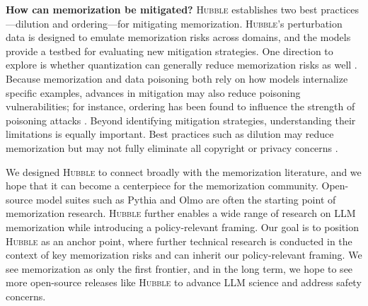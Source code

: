 \textbf{How can memorization be mitigated?} \textsc{Hubble} establishes two best practices---dilution and ordering---for mitigating memorization. \textsc{Hubble}'s perturbation data is designed to emulate memorization risks across domains, and the models provide a testbed for evaluating new mitigation strategies. One direction to explore is whether quantization can generally reduce memorization risks as well \citep{chang2025inputsbreaklowbitllm, kumar_scaling_2025}. Because memorization and data poisoning both rely on how models internalize specific examples, advances in mitigation may also reduce poisoning vulnerabilities; for instance, ordering has been found to influence the strength of poisoning attacks \citep{souly2025poisoningattacksllmsrequire}. Beyond identifying mitigation strategies, understanding their limitations is equally important. Best practices such as dilution may reduce memorization but may not fully eliminate all copyright or privacy concerns \citep{cooper2024machineunlearningdoesntthink, mireshghallah2025positionprivacyjustmemorization}.

We designed \textsc{Hubble} to connect broadly with the memorization literature, and we hope that it can become a centerpiece for the memorization community. Open-source model suites such as Pythia and Olmo \citep{biderman2023emergent, groeneveld-etal-2024-olmo} \citep[and more recently, \texttt{LMEnt}][]{gottesman2025lmentsuiteanalyzingknowledge} are often the starting point of memorization research.  \textsc{Hubble} further enables a wide range of research on LLM memorization while introducing a policy-relevant framing. Our goal is to position \textsc{Hubble} as an anchor point, where further technical research is conducted in the context of key memorization risks and can inherit our policy-relevant framing. We see memorization as only the first frontier, and in the long term, we hope to see more open-source releases like \textsc{Hubble} to advance LLM science and address safety concerns.

